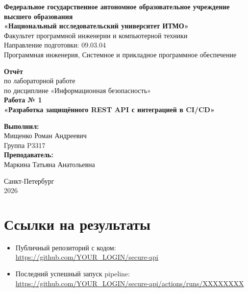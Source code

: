 \documentclass[12pt,a4paper]{article}
\newcommand{\repourl}{https://github.com/YOUR_LOGIN/secure-api}
\newcommand{\runurl}{https://github.com/YOUR_LOGIN/secure-api/actions/runs/XXXXXXXX}
\newcommand{\groupnum}{P3317}
\begin{document}
\begin{titlepage}
\thispagestyle{empty}

\begin{center}

\textbf{Федеральное государственное автономное
образовательное учреждение высшего образования
\\
«Национальный
исследовательский университет ИТМО»}\\[12pt]
Факультет программной инженерии и компьютерной техники\\
Направление подготовки: 09.03.04\\
Программная инженерия, Системное и прикладное программное обеспечение
\end{center}

\vspace*{4cm}

\begin{center}
\textbf{Отчёт}\\[4pt]
по лабораторной работе\\
по дисциплине «Информационная безопасность»\\[1em]
\textbf{Работа № 1}\\[4pt]
\textbf{«Разработка защищённого REST API с интеграцией в CI/CD»}
\end{center}

\vfill

\begin{flushright}
\textbf{Выполнил:}\\
Мищенко Роман Андреевич\\
Группа \groupnum\\[12pt]
\textbf{Преподаватель:}\\
Маркина Татьяна Анатольевна
\end{flushright}

\vfill

\begin{center}
Санкт-Петербург\\
2026
\end{center}

\end{titlepage}

\section{Ссылки на результаты}
\begin{itemize}
  \item Публичный репозиторий с кодом: \url{\repourl}
  \item Последний успешный запуск pipeline: \url{\runurl}
\end{itemize}
\end{document}
